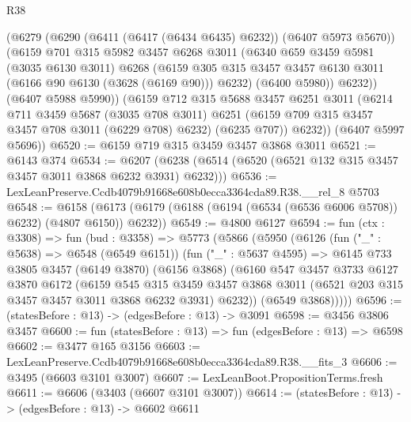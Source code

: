 \begin{lexlean}{R38}
\begin{coremodule}
          (@6279
            (@6290 (@6411 (@6417 (@6434 @6435) @6232)) (@6407 @5973 @5670))
            (@6159
              @701
              @315
              @5982
              @3457
              @6268
              @3011
              (@6340
                @659
                @3459
                @5981
                (@3035 @6130 @3011)
                @6268
                (@6159
                  @305
                  @315
                  @3457
                  @3457
                  @6130
                  @3011
                  (@6166 @90 @6130 (@3628 (@6169 @90)))
                  @6232)
                (@6400 @5980))
              @6232))
          (@6407 @5988 @5990))
        (@6159
          @712
          @315
          @5688
          @3457
          @6251
          @3011
          (@6214
            @711
            @3459
            @5687
            (@3035 @708 @3011)
            @6251
            (@6159 @709 @315 @3457 @3457 @708 @3011 (@6229 @708) @6232)
            (@6235 @707))
          @6232))
      (@6407 @5997 @5696))
@6520 := @6159 @719 @315 @3459 @3457 @3868 @3011
@6521 := @6143 @374
@6534 := @6207 (@6238 (@6514 (@6520 (@6521 @132 @315 @3457 @3457 @3011 @3868 @6232 @3931) @6232)))
@6536 := LexLeanPreserve.Ccdb4079b91668e608b0ecca3364cda89.R38.__rel_8 @5703
@6548 := @6158 (@6173 (@6179 (@6188 (@6194 (@6534 (@6536 @6006 @5708)) @6232) (@4807 @6150)) @6232))
@6549 := @4800 @6127
@6594 := fun (ctx : @3308) =>
  fun (bud : @3358) =>
  @5773
    (@5866
      (@5950
        (@6126
          (fun ("_" : @5638) => @6548 (@6549 @6151))
          (fun ("_" : @5637 @4595) =>
          @6145
            @733
            @3805
            @3457
            (@6149 @3870)
            (@6156 @3868)
            (@6160
              @547
              @3457
              @3733
              @6127
              @3870
              @6172
              (@6159
                @545
                @315
                @3459
                @3457
                @3868
                @3011
                (@6521 @203 @315 @3457 @3457 @3011 @3868 @6232 @3931)
                @6232))
            (@6549 @3868)))))
@6596 := (statesBefore : @13) -> (edgesBefore : @13) -> @3091
@6598 := @3456 @3806 @3457
@6600 := fun (statesBefore : @13) => fun (edgesBefore : @13) => @6598
@6602 := @3477 @165 @3156
@6603 := LexLeanPreserve.Ccdb4079b91668e608b0ecca3364cda89.R38.__fits_3
@6606 := @3495 (@6603 @3101 @3007)
@6607 := LexLeanBoot.PropositionTerms.fresh
@6611 := @6606 (@3403 (@6607 @3101 @3007))
@6614 := (statesBefore : @13) -> (edgesBefore : @13) -> @6602 @6611

\end{coremodule}
\end{lexlean}
